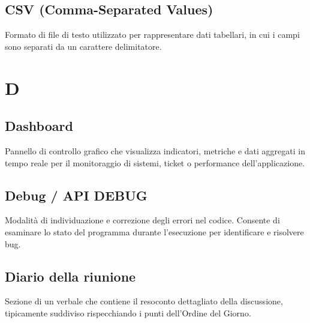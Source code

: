 \documentclass[a4paper, 11pt, oneside]{scrartcl} %
\begin{document}
\subsection*{CSV (Comma-Separated Values)}
Formato di file di testo utilizzato per rappresentare dati tabellari, in cui i campi sono separati da un carattere delimitatore.
\vspace{0.5cm}



\section*{D}


\subsection*{Dashboard}


Pannello di controllo grafico che visualizza indicatori, metriche e dati aggregati in tempo reale per il monitoraggio di sistemi, ticket o performance dell'applicazione.

\vspace{0.5cm}

\subsection*{Debug / API DEBUG}


Modalità di individuazione e correzione degli errori nel codice. Consente di esaminare lo stato del programma durante l'esecuzione per identificare e risolvere bug.

\vspace{0.5cm}

\subsection*{Diario della riunione}


Sezione di un verbale che contiene il resoconto dettagliato della discussione, tipicamente suddiviso rispecchiando i punti dell'Ordine del Giorno.

\vspace{0.5cm}
\end{document}
